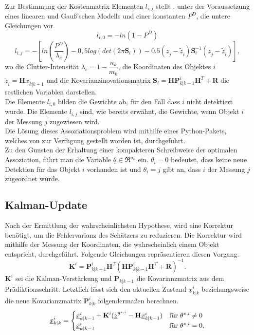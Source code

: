 \documentclass[10pt,a4paper]{article}
\begin{document}
Zur Bestimmung der Kostenmatrix Elementen $l_{i,j}$ stellt \cite{MOTyoutube}, unter der Voraussetzung eines linearen und Gauß’schen Modells und einer konstanten $P^D$, die untere Gleichungen vor.
\begin{equation}
\label{eq:GNNKostenMatrix}
l_{i,0} = - ln(1-P^D)
\end{equation}
\begin{equation*}
l_{i,j} = - [ln(\dfrac{P^D}{\lambda_c})-0,5log(det(2\pi\textbf{S}_i))-0.5(\underline{z}_j- \tilde{\underline{z}}_i)\textbf{S}_i^{-1}(\underline{z}_j- \tilde{\underline{z}}_i)],
\end{equation*}
wo die Clutter-Intensität $\lambda_c = 1- \dfrac{n_k}{m_k}$, die Koordinaten des Objektes $i$ $\tilde{\underline{z}}_i = \textbf{H}\underline{x}_{k|k-1}$ und die Kovarianzinovationsmatrix $\textbf{S}_i = \textbf{H}\textbf{P}_{k|k-1}^i\textbf{H}^T+\textbf{R}$ die restlichen Variablen darstellen.\\
Die Elemente $l_{i,0}$ bilden die Gewichte ab, für den Fall dass $i$ nicht detektiert wurde. Die Elemente $l_{i,j}$ sind, wie bereits erwähnt, die Gewichte, wenn Objekt $i$ der Messung $j$ zugewiesen wird. \\
Die Lösung dieses Assoziationsproblem wird mithilfe eines Python-Pakets, welches von \cite{HungarianPython} zur Verfügung gestellt worden ist, durchgeführt. \\
Zu den Gunsten der Erhaltung einer kompakteren Schreibweise der optimalen Assoziation, führt man die Variable $\underline{\theta} \in \Re^{n_k}$ ein.  $\theta_i = 0$ bedeutet, dass keine neue Detektion für das Objekt $i$ vorhanden ist und $\theta_i = j$ gibt an, dass $i$ der Messung $j$ zugeordnet wurde.
\subsection{Kalman-Update}
Nach der Ermittlung der wahrscheinlichsten Hypothese, wird eine Korrektur benötigt, um die Fehlervarianz des Schätzers zu reduzieren. Die Korrektur wird mithilfe der Messung der Koordinaten, die wahrscheinlich einem Objekt entspricht, durchgeführt. Folgende Gleichungen repräsentieren diesen Vorgang.
\begin{equation}
\textbf{K}^i =  \textbf{P}_{k|k-1}^i\textbf{H}^T(\textbf{H}\textbf{P}_{k|k-1}^i\textbf{H}^T + \textbf{R})^{-1}.
\end{equation}
$\textbf{K}^i$ sei die Kalman-Verstärkung und $\textbf{P}_{k|k-1}$ die Kovarianzmatrix aus dem Prädiktionsschritt. Letztlich lässt sich den aktuellen Zustand $\underline{x}^i_{k|k}$ beziehungsweise die neue Kovarianzmatrix $\textbf{P}_{k|k}^i$ folgendermaßen berechnen.
\begin{equation}
\label{eq:GNNUpdate}
\underline{x}^i_{k|k} = \begin{cases}
\underline{x}^i_{k|k-1}+\textbf{K}^i(\underline{z}^{\theta^{*,i}}- \textbf{H}\underline{x}^i_{k|k-1}) &$für $ \theta^{*,i} \neq 0 \\
\underline{x}^i_{k|k-1} & $für $ \theta^{*,i} = 0,
\end{cases}
\end{equation}
\end{document}
